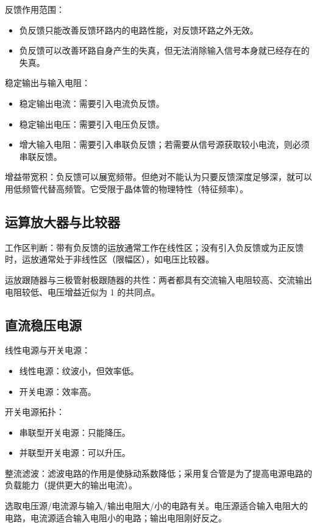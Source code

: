 \documentclass[UTF8,fontset=fandol,zihao=5]{ctexart}
\begin{document}
{反馈作用范围：
\begin{itemize}
  \item 负反馈只能改善反馈环路内的电路性能，对反馈环路之外无效。
  \item 负反馈可以改善环路自身产生的失真，但无法消除输入信号本身就已经存在的失真。
\end{itemize}

稳定输出与输入电阻：
\begin{itemize}
  \item 稳定输出电流：需要引入电流负反馈。
  \item 稳定输出电压：需要引入电压负反馈。
  \item 增大输入电阻：需要引入串联负反馈；若需要从信号源获取较小电流，则必须串联反馈。
\end{itemize}

增益带宽积：负反馈可以展宽频带。但绝对不能认为只要反馈深度足够深，就可以用低频管代替高频管。它受限于晶体管的物理特性（特征频率）。

\subsection{运算放大器与比较器}

工作区判断：带有负反馈的运放通常工作在线性区；没有引入负反馈或为正反馈时，运放通常处于非线性区（限幅区），如电压比较器。

运放跟随器与三极管射极跟随器的共性：两者都具有交流输入电阻较高、交流输出电阻较低、电压增益近似为 1 的共同点。

\subsection{直流稳压电源}

线性电源与开关电源：
\begin{itemize}
  \item 线性电源：纹波小，但效率低。
  \item 开关电源：效率高。
\end{itemize}

开关电源拓扑：
\begin{itemize}
  \item 串联型开关电源：只能降压。
  \item 并联型开关电源：可以升压。
\end{itemize}

整流滤波：滤波电路的作用是使脉动系数降低；采用复合管是为了提高电源电路的负载能力（提供更大的输出电流）。

选取电压源/电流源与输入/输出电阻大/小的电路有关。电压源适合输入电阻大的电路，电流源适合输入电阻小的电路；输出电阻刚好反之。

}
\end{document}
